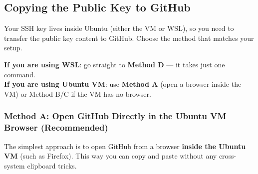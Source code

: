 \documentclass[
    a4paper,
    11pt,
    parskip=half
]{scrartcl}
\begin{document}
\subsection{Copying the Public Key to GitHub}
\label{sec:add-to-github}

Your SSH key lives inside Ubuntu (either the VM or WSL), so you need to transfer the public key content to GitHub. Choose the method that matches your setup.

\begin{notebox}
\textbf{If you are using WSL}: go straight to \textbf{Method D} --- it takes just one command.\\
\textbf{If you are using Ubuntu VM}: use \textbf{Method A} (open a browser inside the VM) or Method B/C if the VM has no browser.
\end{notebox}

\subsubsection*{Method A: Open GitHub Directly in the Ubuntu VM Browser (Recommended)}

The simplest approach is to open GitHub from a browser \textbf{inside the Ubuntu VM} (such as Firefox). This way you can copy and paste without any cross-system clipboard tricks.
\end{document}
